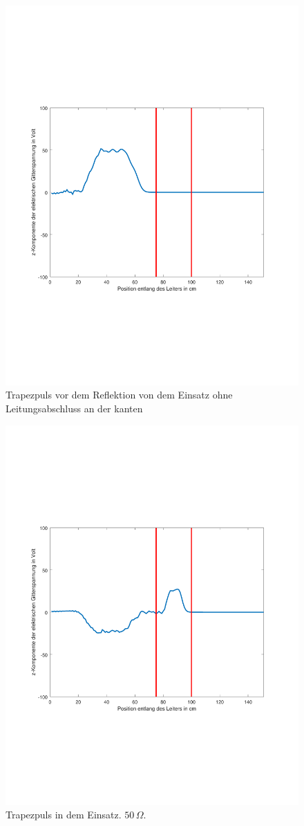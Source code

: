 \documentclass[Protokollheft.tex]{subfiles}
\begin{document}
\begin{figure}[ht]
	\centering
	\includegraphics[trim = 20mm 65mm 20mm 65mm, clip,width=0.7\linewidth]{untitledT1.pdf}
	\caption{Trapezpuls vor dem Reflektion von dem Einsatz ohne Leitungsabschluss an der kanten}\label{fig:inh1}
\end{figure} 
\begin{figure}[ht]
	\centering
	\includegraphics[trim = 20mm 65mm 20mm 65mm, clip,width=0.7\linewidth]{untitledT2.pdf}
	\caption{Trapezpuls in dem Einsatz. $50\,\Omega$.}\label{fig:inh2}
\end{figure} 
\end{document}
